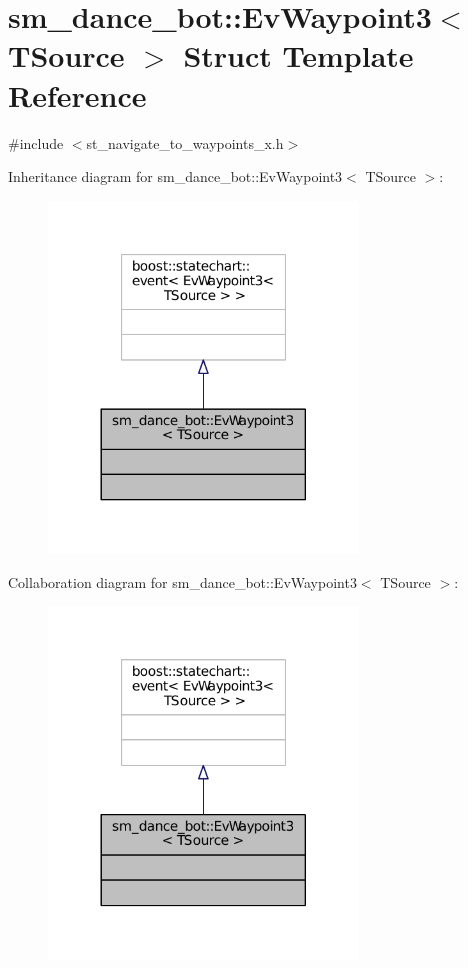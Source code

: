\hypertarget{structsm__dance__bot_1_1EvWaypoint3}{}\section{sm\+\_\+dance\+\_\+bot\+:\+:Ev\+Waypoint3$<$ T\+Source $>$ Struct Template Reference}
\label{structsm__dance__bot_1_1EvWaypoint3}


{\ttfamily \#include $<$st\+\_\+navigate\+\_\+to\+\_\+waypoints\+\_\+x.\+h$>$}



Inheritance diagram for sm\+\_\+dance\+\_\+bot\+:\+:Ev\+Waypoint3$<$ T\+Source $>$\+:
\nopagebreak
\begin{figure}[H]
\begin{center}
\leavevmode
\includegraphics[width=233pt]{structsm__dance__bot_1_1EvWaypoint3__inherit__graph}
\end{center}
\end{figure}


Collaboration diagram for sm\+\_\+dance\+\_\+bot\+:\+:Ev\+Waypoint3$<$ T\+Source $>$\+:
\nopagebreak
\begin{figure}[H]
\begin{center}
\leavevmode
\includegraphics[width=233pt]{structsm__dance__bot_1_1EvWaypoint3__coll__graph}
\end{center}
\end{figure}


